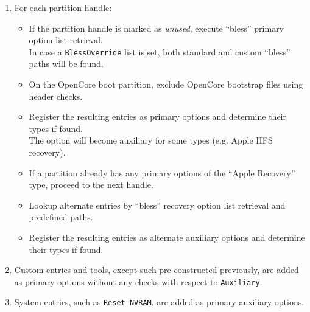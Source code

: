 \documentclass[]{article}
\begin{document}
\begin{enumerate}
\begin{itemize}
  \texttt{InstanceIentifier} matches an \texttt{Instance-List} if present, see below).
  \end{itemize}
\item For each partition handle:
  \begin{itemize}
  \item If the partition handle is marked as \textit{unused}, execute ``bless'' primary option list retrieval. \\
    In case a \texttt{BlessOverride} list is set, both standard and custom ``bless'' paths will be found.
  \item On the OpenCore boot partition, exclude OpenCore bootstrap files using header checks.
  \item Register the resulting entries as primary options and determine their types if found. \\
  The option will become auxiliary for some types (e.g. Apple HFS recovery).
  \item If a partition already has any primary options of the ``Apple Recovery'' type, proceed to the next handle.
  \item Lookup alternate entries by ``bless'' recovery option list retrieval and predefined paths.
  \item Register the resulting entries as alternate auxiliary options and determine their types if found.
  \end{itemize}
\item Custom entries and tools, except such pre-constructed previously, are added as primary options
without any checks with respect to \texttt{Auxiliary}.
\item System entries, such as \texttt{Reset NVRAM}, are added as primary auxiliary options.
\end{enumerate}
\end{document}

